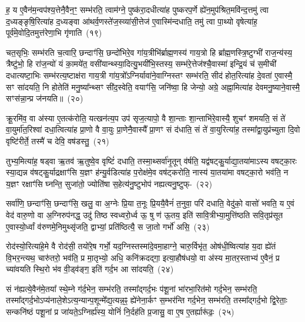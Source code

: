 ह॒ य ए॒वैन॑म॒न्वप॑श्य॒त्तेनै॒वैन॒ꣳ॒ सम्भ॑रति॒ त्वाम॑ग्ने॒ पुष्क॑रा॒दधीत्या॑ह पुष्करप॒र्णे ह्ये॑न॒मुप॑श्रित॒मवि॑न्द॒त्तमु॑ त्वा द॒ध्यङ्ङृषि॒रित्या॑ह द॒ध्यङ्वा आ॑थर्व॒णस्ते॑ज॒स्व्या॑सी॒त्तेज॑ ए॒वास्मि॑न्दधाति॒ तमु॑ त्वा पा॒थ्यो वृषेत्या॑ह॒ पूर्व॑मे॒वोदि॒तमुत्त॑रेणा॒भि गृ॑णाति~(१९)\ip

चत॒सृभिः॒ सम्भ॑रति च॒त्वारि॒ छन्दाꣳ॑सि॒ छन्दो॑भिरे॒व गा॑य॒त्रीभि॑र्ब्राह्म॒णस्य॑ गाय॒त्रो हि ब्रा᳚ह्म॒णस्त्रि॒ष्टुग्भी॑ राज॒न्य॑स्य॒ त्रैष्टु॑भो॒ हि रा॑ज॒न्यो॑ यं का॒मये॑त॒ वसी॑यान्थ्स्या॒दित्यु॒भयी॑भि॒स्तस्य॒ सम्भ॑रे॒त्तेज॑श्चै॒वास्मा॑ इन्द्रि॒यं च॑ स॒मीची॑ दधात्यष्टा॒भिः सम्भ॑रत्य॒ष्टाक्ष॑रा गाय॒त्री गा॑य॒त्रो᳚\-ऽग्निर्यावा॑ने॒वाग्निस्तꣳ सम्भ॑रति॒ सीद॑ होत॒रित्या॑ह दे॒वता॑ ए॒वास्मै॒ सꣳ सा॑दयति॒ नि होतेति॑ मनु॒ष्या᳚न्थ्सꣳ सी॑द॒स्वेति॒ वयाꣳ॑सि॒ जनि॑ष्वा॒ हि जेन्यो॒ अग्रे॒ अह्ना॒मित्या॑ह देवमनु॒ष्याने॒वास्मै॒ सꣳस॑न्ना॒न्प्र ज॑नयति॥~(२०)\ip

{\anuvakamend[{ऐव प॒शूनिति॑ गृणाति होत॒रिति॑ स॒प्तविꣳ॑शतिश्च}]}

क्रू॒रमि॑व॒ वा अ॑स्या ए॒तत्क॑रोति॒ यत्खन॑त्य॒प उप॑ सृज॒त्यापो॒ वै शा॒न्ताः शा॒न्ताभि॑रे॒वास्यै॒ शुचꣳ॑ शमयति॒ सं ते॑ वा॒युर्मा॑त॒रिश्वा॑ दधा॒त्वित्या॑ह प्रा॒णो वै वा॒युः प्रा॒णेनै॒वास्यै᳚ प्रा॒णꣳ सं द॑धाति॒ सं ते॑ वा॒युरित्या॑ह॒ तस्मा᳚द्\-वा॒युप्र॑च्युता दि॒वो वृष्टि॑रीर्ते॒ तस्मै॑ च देवि॒ वष॑डस्तु॒~(२१)\ip

तुभ्य॒मित्या॑ह॒ षड्वा ऋ॒तव॑ ऋ॒तुष्वे॒व वृष्टिं॑ दधाति॒ तस्मा॒थ्सर्वा॑नृ॒तून् व॑र्\mbox{}षति॒ यद्व॑षट्कु॒र्याद्या॒तया॑माऽस्य वषट्का॒रः स्या॒द्यन्न व॑षट्कु॒र्याद्रक्षाꣳ॑सि य॒ज्ञꣳ ह॑न्यु॒र्वडित्या॑ह प॒रोक्ष॑मे॒व वष॑ट्करोति॒ नास्य॑ या॒तया॑मा वषट्का॒रो भव॑ति॒ न य॒ज्ञꣳ रक्षाꣳ॑सि घ्नन्ति॒ सुजा॑तो॒ ज्योति॑षा स॒हेत्य॑नु॒ष्टुभोप॑ नह्यत्यनु॒ष्टुफ्-~(२२)\ip

सर्वा॑णि॒ छन्दाꣳ॑सि॒ छन्दाꣳ॑सि॒ खलु॒ वा अ॒ग्नेः प्रि॒या त॒नूः प्रि॒ययै॒वैनं॑ त॒नुवा॒ परि॑ दधाति॒ वेदु॑को॒ वासो॑ भवति॒ य ए॒वं वेद॑ वारु॒णो वा अ॒ग्निरुप॑नद्ध॒ उदु॑ तिष्ठ स्वध्वरो॒र्ध्व ऊ॒ षु ण॑ ऊ॒तय॒ इति॑ सावि॒त्रीभ्या॒मुत्ति॑ष्ठति सवि॒तृप्र॑सूत ए॒वास्यो॒र्ध्वां व॑रुणमे॒निमुथ्सृ॑जति॒ द्वाभ्यां॒ प्रति॑ष्ठित्यै॒ स जा॒तो गर्भो॑ असि॒~(२३)\ip

रोद॑स्यो॒रित्या॑हे॒मे वै रोद॑सी॒ तयो॑रे॒ष गर्भो॒ यद॒ग्निस्तस्मा॑दे॒वमा॒हाग्ने॒ चारु॒र्विभृ॑त॒ ओष॑धी॒ष्वित्या॑ह य॒दा ह्ये॑तं वि॒भर॒न्त्यथ॒ चारु॑तरो॒ भव॑ति॒ प्र मा॒तृभ्यो॒ अधि॒ कनि॑क्रदद्गा॒ इत्या॒हौष॑धयो॒ वा अ॑स्य मा॒तर॒स्ताभ्य॑ ए॒वैनं॒ प्र च्या॑वयति स्थि॒रो भ॑व वी॒ड्व॑ङ्ग॒ इति॑ गर्द॒भ आ सा॑दयति॒~(२४)\ip

सं न॑ह्यत्ये॒वैन॑मे॒तया᳚ स्थे॒म्ने ग॑र्द॒भेन॒ सम्भ॑रति॒ तस्मा᳚द्\-गर्द॒भः प॑शू॒नां भा॑रभा॒रित॑मो गर्द॒भेन॒ सम्भ॑रति॒ तस्मा᳚द्\-गर्द॒भो\-ऽप्य॑नाले॒शे\-ऽ\-त्य॒न्यान्प॒शून्मे᳚द्य॒त्यन्न॒ꣴ॒ ह्ये॑नेना॒र्कꣳ स॒म्भर॑न्ति गर्द॒भेन॒ सम्भ॑रति॒ तस्मा᳚द्\-गर्द॒भो द्वि॒रेताः॒ सन्कनि॑ष्ठं पशू॒नां प्र जा॑यते॒\-ऽग्निर्ह्य॑स्य॒ योनिं॑ नि॒र्दह॑ति प्र॒जासु॒ वा ए॒ष ए॒तर्\mbox{}ह्यारू॑ढः॒~(२५)\ip

